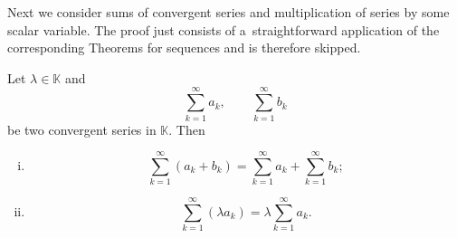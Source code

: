 

Next we consider sums of convergent series and multiplication of series by some scalar variable. The proof just consists of a~straightforward application of the corresponding Theorems for sequences and is therefore skipped.

\begin{Theorem}\label{thm:serlimformnormed}
Let $\lambda\in\mathbb{K}$ and
\[\sum_{k=1}^\infty a_k,\qquad \sum_{k=1}^\infty b_k\]
be two convergent series in $\mathbb{K}$. Then
\begin{enumerate}[(i)]
 \item \[\sum_{k=1}^\infty(a_k+b_k)=\sum_{k=1}^\infty a_k+\sum_{k=1}^\infty b_k;\]
 \item \[\sum_{k=1}^\infty(\lambda a_k)=\lambda \sum_{k=1}^\infty a_k.\]
\end{enumerate}
\end{Theorem}

